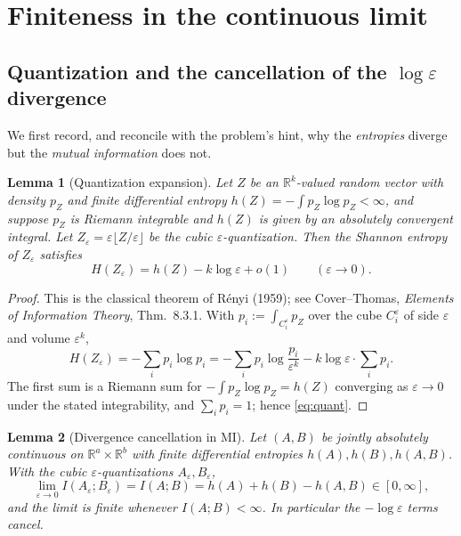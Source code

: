 \documentclass{amsart}
\newtheorem{lemma}{Lemma}
\theoremstyle{definition}
\theoremstyle{remark}
\newcommand{\R}{\mathbb{R}}
\begin{document}
\section{Finiteness in the continuous limit}\label{sec:finite}

\subsection{Quantization and the cancellation of the $\log\varepsilon$
divergence}
We first record, and reconcile with the problem's hint, why the
\emph{entropies} diverge but the \emph{mutual information} does not.

\begin{lemma}[Quantization expansion]\label{lem:quant}
Let $Z$ be an $\R^k$-valued random vector with density $p_Z$ and finite
differential entropy $h(Z)=-\int p_Z\log p_Z<\infty$, and suppose
$p_Z$ is Riemann integrable and $h(Z)$ is given by an absolutely
convergent integral. Let $Z_\varepsilon=\varepsilon\lfloor
Z/\varepsilon\rfloor$ be the cubic $\varepsilon$-quantization. Then the
Shannon entropy of $Z_\varepsilon$ satisfies
\begin{equation}\label{eq:quant}
H(Z_\varepsilon)=h(Z)-k\log\varepsilon+o(1)\qquad(\varepsilon\to0).
\end{equation}
\end{lemma}

\begin{proof}
This is the classical theorem of R\'enyi (1959); see Cover--Thomas,
\emph{Elements of Information Theory}, Thm.~8.3.1. With
$p_i:=\int_{C_i^\varepsilon}p_Z$ over the cube $C_i^\varepsilon$ of side
$\varepsilon$ and volume $\varepsilon^k$,
\[
H(Z_\varepsilon)=-\sum_i p_i\log p_i
=-\sum_i p_i\log\frac{p_i}{\varepsilon^k}-k\log\varepsilon\cdot\sum_ip_i .
\]
The first sum is a Riemann sum for $-\int p_Z\log p_Z=h(Z)$ converging
as $\varepsilon\to0$ under the stated integrability, and
$\sum_i p_i=1$; hence \eqref{eq:quant}.
\end{proof}

\begin{lemma}[Divergence cancellation in MI]\label{lem:cancel}
Let $(A,B)$ be jointly absolutely continuous on
$\R^{a}\times\R^{b}$ with finite differential entropies
$h(A),h(B),h(A,B)$. With the cubic $\varepsilon$-quantizations
$A_\varepsilon,B_\varepsilon$,
\begin{equation}\label{eq:cancel}
\lim_{\varepsilon\to0} I(A_\varepsilon;B_\varepsilon)=I(A;B)
= h(A)+h(B)-h(A,B)\in[0,\infty],
\end{equation}
and the limit is finite whenever $I(A;B)<\infty$. In particular the
$-\log\varepsilon$ terms cancel.
\end{lemma}
\end{document}
